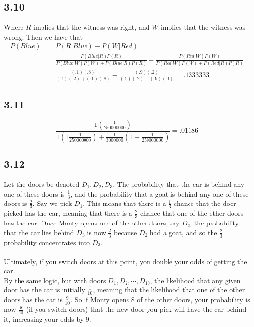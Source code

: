 \documentclass[letterpaper,12pt]{article}
\theoremstyle{definition}
\begin{document}
\subsection*{3.10}
Where $R$ implies that the witness was right, and $W$ implies that the witness was wrong. Then we have that
\begin{align*}
    P(Blue) &= P(R|Blue) - P(W|Red)\\
    &= \frac{P(Blue|R)P(R)}{P(Blue|W)P(W) + P(Blue|R)P(R)} - \frac{P(Red|W)P(W)}{P(Red|W)P(W) + P(Red|R)P(R)}\\
    &= \frac{(.1)(.8)}{(.1)(.2) + (.1)(.8)} -  \frac{(.9)(.2)}{(.9)(.2) + (.9)(.1)} = .1333333
\end{align*}

\subsection*{3.11}

\[\frac{1\left( \frac{1}{250000000} \right)}{ 1 \left( 1 \frac{1}{250000000} \right) + \frac{1}{3000000}(1- \frac{1}{250000000})} = .01186\]





\subsection*{3.12}
Let the doors be denoted $D_1, D_2, D_3$. The probability that the car is behind any one of these doors is $\frac{1}{3}$, and the probability that a goat is behind any one of these doors is $\frac{2}{3}$. Say we pick $D_1$. This means that there is a $\frac{1}{3}$ chance that the door picked has the car, meaning that there is a $\frac{2}{3}$ chance that one of the other doors has the car. Once Monty opens one of the other doors, say $D_2$, the probability that the car lies behind $D_3$ is now $\frac{2}{3}$ because $D_2$ had a goat, and so the $\frac{2}{3}$ probability concentrates into $D_3$.\\\\
Ultimately, if you switch doors at this point, you double your odds of getting the car.
\\
By the same logic, but with doors $D_1, D_2,\cdots, D_{10}$, the likelihood that any given door has the car is initially $\frac{1}{10}$, meaning that the likelihood that one of the other doors has the car is $\frac{9}{10}$. So if Monty opens 8 of the other doors, your probability is now $\frac{9}{10}$ (if you switch doors) that the new door you pick will have the car behind it, increasing your odds by 9.
\end{document}
